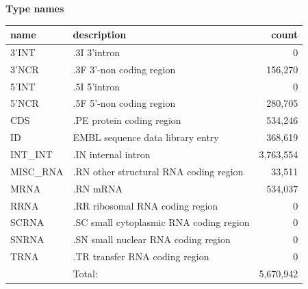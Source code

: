 \documentclass{article}
\begin{document}
\begin{Schunk}
\textbf{Type names}
\noindent\begin{tabular}{llr}
\hline \hline
name & description & count \\
\hline
3'INT  &  .3I 3'intron  &  0 \\
3'NCR  &  .3F  3'-non coding region  &  156,270 \\
5'INT  &  .5I 5'intron  &  0 \\
5'NCR  &  .5F  5'-non coding region  &  280,705 \\
CDS  &  .PE protein coding region  &  534,246 \\
ID  &  EMBL sequence data library entry  &  368,619 \\
INT\_INT  &  .IN  internal intron  &  3,763,554 \\
MISC\_RNA  &  .RN other structural RNA coding region  &  33,511 \\
MRNA  &  .RN mRNA  &  534,037 \\
RRNA  &  .RR ribosomal RNA coding region  &  0 \\
SCRNA  &  .SC small cytoplasmic RNA coding region  &  0 \\
SNRNA  &  .SN small nuclear RNA coding region  &  0 \\
TRNA  &  .TR transfer RNA coding region  &  0 \\
\hline
 & Total: & 5,670,942 \\
\hline \hline
\end{tabular}


\end{Schunk}
\end{document}
